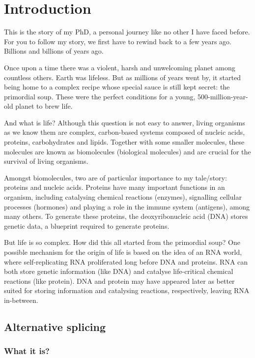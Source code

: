 \chapter{Introduction}

This is the story of my PhD, a personal journey like no other I have faced before. For you to follow my story, we first have to rewind back to a few years ago. Billions and billions of years ago.

Once upon a time there was a violent, harsh and unwelcoming planet among countless others. Earth was lifeless. But as millions of years went by, it started being home to a complex recipe whose special sauce is still kept secret: the primordial soup. These were the perfect conditions for a young, 500-million-year-old planet to brew life.

And what is life? Although this question is not easy to answer, living organisms as we know them are complex, carbon-based systems composed of nucleic acids, proteins, carbohydrates and lipids. Together with some smaller molecules, these molecules are known as biomolecules (biological molecules) and are crucial for the survival of living organisms.

Amongst biomolecules, two are of particular importance to my tale/story: proteins and nucleic acids. Proteins have many important functions in an organism, including catalysing chemical reactions (enzymes), signalling cellular processes (hormones) and playing a role in the immune system (antigens), among many others. To generate these proteins, the deoxyribonucleic acid (DNA) stores genetic data, a blueprint required to generate proteins.

But life is so complex. How did this all started from the primordial soup? One possible mechanism for the origin of life is based on the idea of an RNA world, where self-replicating RNA proliferated long before DNA and proteins. RNA can both store genetic information (like DNA) and catalyse life-critical chemical reactions (like protein). DNA and protein may have appeared later as better suited for storing information and catalysing reactions, respectively, leaving RNA in-between.

\section{Alternative splicing}

\subsection{What it is?}

